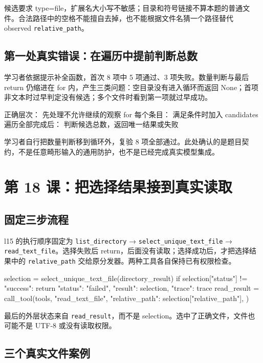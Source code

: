 \documentclass[UTF8,zihao=-4,fontset=fandol]{ctexart}
\begin{document}
候选要求 type=file，扩展名大小写不敏感；目录和符号链接不算本题的普通文件。合法路径中的空格不能擅自去掉，也不能根据文件名猜一个路径替代 observed \nolinkurl{relative_path}。

\subsection{第一处真实错误：在遍历中提前判断总数}

学习者依据提示补全函数，首次 8 项中 5 项通过、3 项失败。数量判断与最后 return 仍缩进在 for 内，产生三类问题：空目录没有进入循环而返回 None；首项非文本时过早判定没有候选；多个文件时看到第一项就过早成功。

\begin{Code}
正确层次：
先处理不允许继续的观察
for 每个条目：
    满足条件时加入 candidates
遍历全部完成后：
    判断候选总数，返回唯一结果或失败
\end{Code}

学习者自行把数量判断移到循环外，复验 8 项全部通过。此处确认的是题目契约，不是任意畸形输入的通用防护，也不是已经完成真实模型集成。

\section{第 18 课：把选择结果接到真实读取}

\subsection{固定三步流程}

l15 的执行顺序固定为 \nolinkurl{list_directory} → \nolinkurl{select_unique_text_file} → \nolinkurl{read_text_file}。选择失败后 return，后面没有读取；选择成功后，才把选择结果中的 \nolinkurl{relative_path} 交给原分发器。两种工具各自保持已有权限检查。

\begin{Code}
selection = select_unique_text_file(directory_result)
if selection["status"] != "success":
    return {"status": "failed", "result": selection, "trace": trace}
read_result = call_tool(tools, "read_text_file", {
    "relative_path": selection["relative_path"],
})
\end{Code}

最后的外层状态来自 \nolinkurl{read_result}，而不是 selection。选中了正确文件，文件也可能不是 UTF-8 或没有读取权限。

\subsection{三个真实文件案例}
\end{document}

